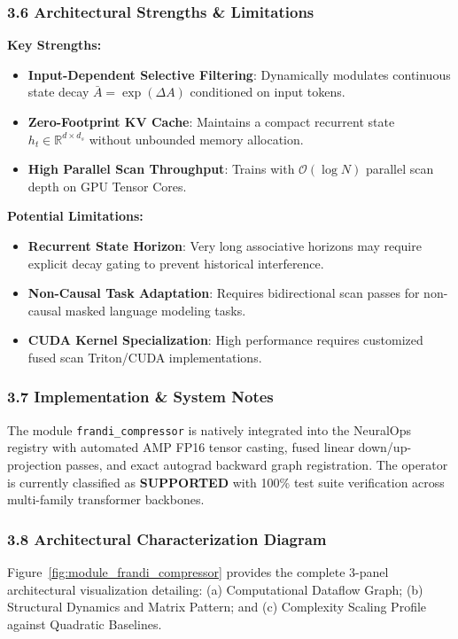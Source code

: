 \subsubsection*{3.6 Architectural Strengths \& Limitations}
\textbf{Key Strengths:}
\begin{itemize}
    \item \textbf{Input-Dependent Selective Filtering}: Dynamically modulates continuous state decay $\bar{A} = \exp(\Delta A)$ conditioned on input tokens.
    \item \textbf{Zero-Footprint KV Cache}: Maintains a compact recurrent state $h_t \in \mathbb{R}^{d \times d_s}$ without unbounded memory allocation.
    \item \textbf{High Parallel Scan Throughput}: Trains with $\mathcal{O}(\log N)$ parallel scan depth on GPU Tensor Cores.
\end{itemize}

\textbf{Potential Limitations:}
\begin{itemize}
    \item \textbf{Recurrent State Horizon}: Very long associative horizons may require explicit decay gating to prevent historical interference.
    \item \textbf{Non-Causal Task Adaptation}: Requires bidirectional scan passes for non-causal masked language modeling tasks.
    \item \textbf{CUDA Kernel Specialization}: High performance requires customized fused scan Triton/CUDA implementations.
\end{itemize}

\subsubsection*{3.7 Implementation \& System Notes}
The module \texttt{frandi\_compressor} is natively integrated into the NeuralOps registry with automated AMP FP16 tensor casting, fused linear down/up-projection passes, and exact autograd backward graph registration. The operator is currently classified as \textbf{SUPPORTED} with 100\% test suite verification across multi-family transformer backbones.

\subsubsection*{3.8 Architectural Characterization Diagram}
Figure~\ref{fig:module_frandi_compressor} provides the complete 3-panel architectural visualization detailing: (a) Computational Dataflow Graph; (b) Structural Dynamics and Matrix Pattern; and (c) Complexity Scaling Profile against Quadratic Baselines.

